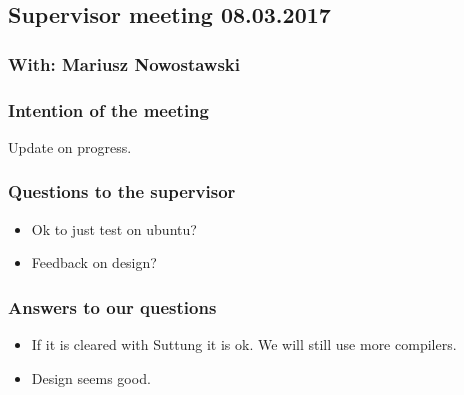 \documentclass{article}
\begin{document}
\begin{center}
\subsection*{Supervisor meeting 08.03.2017}
\subsubsection*{With: Mariusz Nowostawski}
\end{center}

\bigskip


\subsubsection*{Intention of the meeting}
Update on progress.


\subsubsection*{Questions to the supervisor}
\begin{itemize}
    \item 
    Ok to just test on ubuntu?
    
    \item 
    Feedback on design?
\end{itemize}


\subsubsection*{Answers to our questions}
\begin{itemize}
    \item 
    If it is cleared with Suttung it is ok. 
    We will still use more compilers.
    
    \item 
    Design seems good.
\end{itemize}
\end{document}
